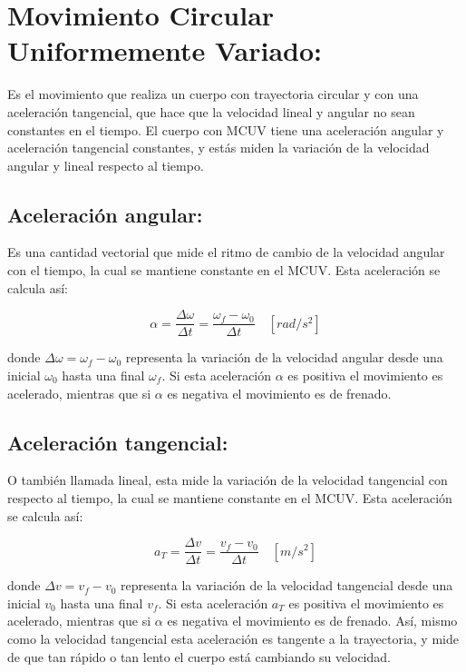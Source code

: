 \documentclass[a5paper,pagesize,10pt,bibtotoc,pointlessnumbers,
normalheadings,DIV=9,fleqn,x11names,table,twoside=false]{scrbook}
\begin{document}
\section{Movimiento Circular Uniformemente Variado:}

Es el movimiento que realiza un cuerpo con trayectoria circular y con una aceleración tangencial, que hace que la velocidad 
lineal y angular no sean constantes en el tiempo. El cuerpo con MCUV tiene una aceleración angular y aceleración tangencial 
constantes, y estás miden la variación de la velocidad angular y lineal respecto al tiempo.\\

\subsection{Aceleración angular:}

Es una cantidad vectorial que mide el ritmo de cambio de la velocidad angular con el tiempo, la cual se mantiene constante en el 
MCUV. Esta aceleración se calcula así:

\begin{equation}
\alpha = \frac{\Delta \omega}{\Delta t} =  \frac{\omega_f - \omega_0}{\Delta t}\quad [rad/s^2]
\end{equation}
  

donde $\Delta \omega = \omega_f-\omega_0$ representa la variación de la velocidad angular desde una inicial $\omega_0$ hasta una 
final $\omega_f$. Si esta aceleración $\alpha$ es positiva el movimiento es acelerado, mientras que si $\alpha$ es negativa el 
movimiento es de frenado.

\subsection{Aceleración tangencial:}

O también llamada lineal, esta mide la variación de la velocidad tangencial con respecto al tiempo, la cual se mantiene constante 
en el MCUV. Esta aceleración se calcula así:

\begin{equation}
a_T =\frac{\Delta v}{\Delta t} =\frac{v_f-v_0}{\Delta t}\quad [m/s^2]
\end{equation} 

donde $\Delta v = v_f-v_0$ representa la variación de la velocidad tangencial desde una inicial $v_0$ hasta una final $v_f$. Si 
esta aceleración $a_T$ es positiva el movimiento es acelerado, mientras que si $\alpha$ es negativa el movimiento es de frenado. 
Así, mismo como la velocidad tangencial esta aceleración es tangente a la trayectoria, y mide de que tan rápido o tan lento el 
cuerpo está cambiando su velocidad.
\end{document}

